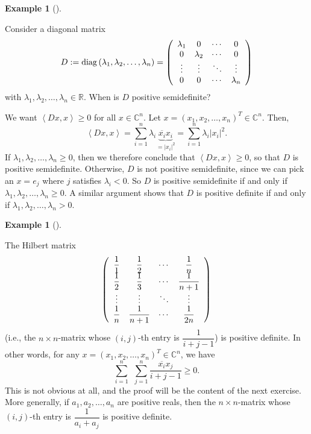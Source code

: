 \documentclass[numbers=enddot,12pt,final,onecolumn,notitlepage]{scrartcl}%
\newcounter{exer}
\numberwithin{exer}{subsection}
\theoremstyle{definition}
\newtheorem{exam}[theo]{Example}
\newenvironment{example}[1][]
{\begin{exam}[#1]\begin{leftbar}}
{\end{leftbar}\end{exam}}
\let\sumnonlimits\sum
\renewcommand{\sum}{\sumnonlimits\limits}
\begin{document}
\begin{example}
Consider a diagonal matrix
\[
D:=\operatorname*{diag}\left(  \lambda_{1},\lambda_{2},\ldots,\lambda
_{n}\right)  =\left(
\begin{array}
[c]{cccc}%
\lambda_{1} & 0 & \cdots & 0\\
0 & \lambda_{2} & \cdots & 0\\
\vdots & \vdots & \ddots & \vdots\\
0 & 0 & \cdots & \lambda_{n}%
\end{array}
\right)
\]
with $\lambda_{1},\lambda_{2},\ldots,\lambda_{n}\in\mathbb{R}$. When is $D$
positive semidefinite?

We want $\left\langle Dx,x\right\rangle \geq0$ for all $x\in\mathbb{C}^{n}$.
Let $x=\left(  x_{1},x_{2},\ldots,x_{n}\right)  ^{T}\in\mathbb{C}^{n}$. Then,%
\[
\left\langle Dx,x\right\rangle =\sum_{i=1}^{n}\lambda_{i}\underbrace{\overline
{x_{i}}x_{i}}_{=\left\vert x_{i}\right\vert ^{2}}=\sum_{i=1}^{n}\lambda
_{i}\left\vert x_{i}\right\vert ^{2}.
\]
If $\lambda_{1},\lambda_{2},\ldots,\lambda_{n}\geq0$, then we therefore
conclude that $\left\langle Dx,x\right\rangle \geq0$, so that $D$ is positive
semidefinite. Otherwise, $D$ is not positive semidefinite, since we can pick
an $x=e_{j}$ where $j$ satisfies $\lambda_{i}<0$. So $D$ is positive
semidefinite if and only if $\lambda_{1},\lambda_{2},\ldots,\lambda_{n}\geq0$.
A similar argument shows that $D$ is positive definite if and only if
$\lambda_{1},\lambda_{2},\ldots,\lambda_{n}>0$.
\end{example}

\begin{example}
The Hilbert matrix%
\[
\left(
\begin{array}
[c]{cccc}%
\dfrac{1}{1} & \dfrac{1}{2} & \cdots & \dfrac{1}{n}\\
\dfrac{1}{2} & \dfrac{1}{3} & \cdots & \dfrac{1}{n+1}\\
\vdots & \vdots & \ddots & \vdots\\
\dfrac{1}{n} & \dfrac{1}{n+1} & \cdots & \dfrac{1}{2n}%
\end{array}
\right)
\]
(i.e., the $n\times n$-matrix whose $\left(  i,j\right)  $-th entry is
$\dfrac{1}{i+j-1}$) is positive definite. In other words, for any $x=\left(
x_{1},x_{2},\ldots,x_{n}\right)  ^{T}\in\mathbb{C}^{n}$, we have%
\[
\sum_{i=1}^{n}\ \ \sum_{j=1}^{n}\dfrac{\overline{x_{i}}x_{j}}{i+j-1}\geq0.
\]
This is not obvious at all, and the proof will be the content of the next
exercise. More generally, if $a_{1},a_{2},\ldots,a_{n}$ are positive reals,
then the $n\times n$-matrix whose $\left(  i,j\right)  $-th entry is
$\dfrac{1}{a_{i}+a_{j}}$ is positive definite.
\end{example}
\end{document}
